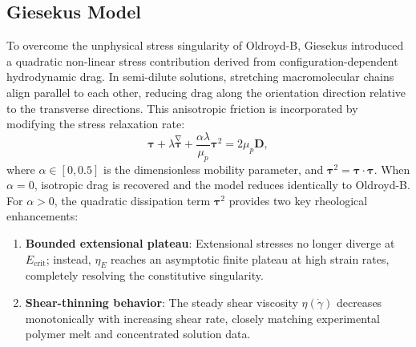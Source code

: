 \subsection{Giesekus Model}
\label{subsec:giesekus_model}
To overcome the unphysical stress singularity of Oldroyd-B, Giesekus \cite{giesekus1982simple, bird1987dynamics}
introduced a quadratic non-linear stress contribution derived from
configuration-dependent hydrodynamic drag.
In semi-dilute solutions, stretching macromolecular chains align parallel to each other,
reducing drag along the orientation direction relative to the transverse directions.
This anisotropic friction is incorporated by modifying the stress relaxation rate:
\begin{equation}
    \boldsymbol{\tau} + \lambda \overset{\nabla}{\boldsymbol{\tau}} + \frac{\alpha \lambda}{\mu_p} \boldsymbol{\tau}^2 = 2\mu_p \boldsymbol{D} ,
    \label{eq:giesekus_dimensional}
\end{equation}
where $\alpha \in [0, 0.5]$ is the dimensionless mobility parameter, and $\boldsymbol{\tau}^2 = \boldsymbol{\tau} \cdot \boldsymbol{\tau}$.
When $\alpha = 0$, isotropic drag is recovered and the model reduces identically to Oldroyd-B.
For $\alpha > 0$, the quadratic dissipation term $\boldsymbol{\tau}^2$ provides two key rheological enhancements:
\begin{enumerate}
    \item \textbf{Bounded extensional plateau}: Extensional stresses no longer diverge at $E_{\mathrm{crit}}$;
    instead, $\eta_E$ reaches an asymptotic finite plateau at high strain rates, completely resolving the constitutive singularity.
    \item \textbf{Shear-thinning behavior}: The steady shear viscosity $\eta(\dot{\gamma})$ decreases monotonically with increasing shear rate,
    closely matching experimental polymer melt and concentrated solution data.
\end{enumerate}

